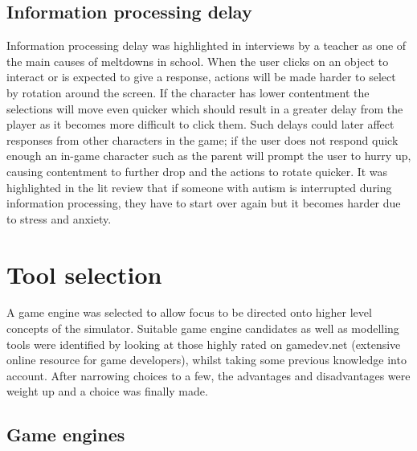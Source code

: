 \subsection{Information processing delay}
Information processing delay was highlighted in interviews by a teacher as one of the main causes of meltdowns in school. When the user clicks on an object to interact or is expected to give a response, actions will be made harder to select by rotation around the screen. If the character has lower contentment the selections will move even quicker which should result in a greater delay from the player as it becomes more difficult to click them. Such delays could later affect responses from other characters in the game; if the user does not respond quick enough an in-game character such as the parent will prompt the user to hurry up, causing contentment to further drop and the actions to rotate quicker. It was highlighted in the lit review that if someone with autism is interrupted during information processing, they have to start over again but it becomes harder due to stress and anxiety. 

\section{Tool selection}
A game engine was selected to allow focus to be directed onto higher level concepts of the simulator. Suitable game engine candidates as well as modelling tools were identified by looking at those highly rated on gamedev.net (extensive online resource for game developers), whilst taking some previous knowledge into account. After narrowing choices to a few, the advantages and disadvantages were weight up and a choice was finally made. 

\subsection{Game engines}

